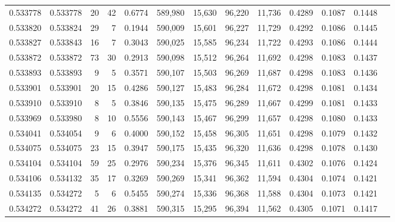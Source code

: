 \begin{tabular}{rrrrrrrrrrrrr}
0.533778 & 0.533778 &    20 &    42 &                                     0.6774 & 589,980 &  15,630 &  96,220 &  11,736 & 0.4289 & 0.1087 & 0.1448 \\
0.533820 & 0.533824 &    29 &     7 &                                     0.1944 & 590,009 &  15,601 &  96,227 &  11,729 & 0.4292 & 0.1086 & 0.1445 \\
0.533827 & 0.533843 &    16 &     7 &                                     0.3043 & 590,025 &  15,585 &  96,234 &  11,722 & 0.4293 & 0.1086 & 0.1444 \\
0.533872 & 0.533872 &    73 &    30 &                                     0.2913 & 590,098 &  15,512 &  96,264 &  11,692 & 0.4298 & 0.1083 & 0.1437 \\
0.533893 & 0.533893 &     9 &     5 &                                     0.3571 & 590,107 &  15,503 &  96,269 &  11,687 & 0.4298 & 0.1083 & 0.1436 \\
0.533901 & 0.533901 &    20 &    15 &                                     0.4286 & 590,127 &  15,483 &  96,284 &  11,672 & 0.4298 & 0.1081 & 0.1434 \\
0.533910 & 0.533910 &     8 &     5 &                                     0.3846 & 590,135 &  15,475 &  96,289 &  11,667 & 0.4299 & 0.1081 & 0.1433 \\
0.533969 & 0.533980 &     8 &    10 &                                     0.5556 & 590,143 &  15,467 &  96,299 &  11,657 & 0.4298 & 0.1080 & 0.1433 \\
0.534041 & 0.534054 &     9 &     6 &                                     0.4000 & 590,152 &  15,458 &  96,305 &  11,651 & 0.4298 & 0.1079 & 0.1432 \\
0.534075 & 0.534075 &    23 &    15 &                                     0.3947 & 590,175 &  15,435 &  96,320 &  11,636 & 0.4298 & 0.1078 & 0.1430 \\
0.534104 & 0.534104 &    59 &    25 &                                     0.2976 & 590,234 &  15,376 &  96,345 &  11,611 & 0.4302 & 0.1076 & 0.1424 \\
0.534106 & 0.534132 &    35 &    17 &                                     0.3269 & 590,269 &  15,341 &  96,362 &  11,594 & 0.4304 & 0.1074 & 0.1421 \\
0.534135 & 0.534272 &     5 &     6 &                                     0.5455 & 590,274 &  15,336 &  96,368 &  11,588 & 0.4304 & 0.1073 & 0.1421 \\
0.534272 & 0.534272 &    41 &    26 &                                     0.3881 & 590,315 &  15,295 &  96,394 &  11,562 & 0.4305 & 0.1071 & 0.1417 \\

\end{tabular}

